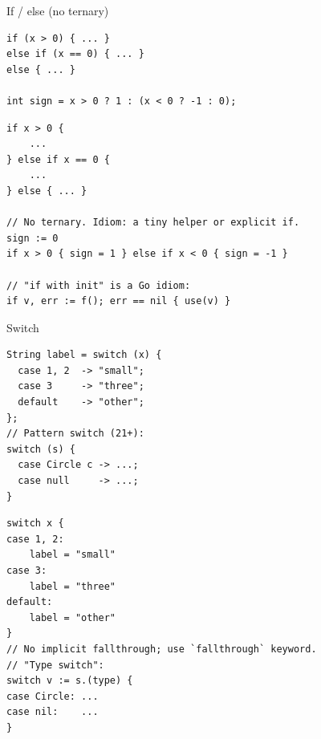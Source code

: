 \documentclass[10pt]{article}
\begin{document}
\begin{construct}{If / else (no ternary)}
\noindent
\begin{minipage}[t]{0.485\linewidth}
\begin{lstlisting}[style=java, title=Java]
if (x > 0) { ... }
else if (x == 0) { ... }
else { ... }

int sign = x > 0 ? 1 : (x < 0 ? -1 : 0);
\end{lstlisting}
\end{minipage}\hfill
\begin{minipage}[t]{0.485\linewidth}
\begin{lstlisting}[style=go, title=Go]
if x > 0 {
    ...
} else if x == 0 {
    ...
} else { ... }

// No ternary. Idiom: a tiny helper or explicit if.
sign := 0
if x > 0 { sign = 1 } else if x < 0 { sign = -1 }

// "if with init" is a Go idiom:
if v, err := f(); err == nil { use(v) }
\end{lstlisting}
\end{minipage}
\end{construct}

\begin{construct}{Switch}
\noindent
\begin{minipage}[t]{0.485\linewidth}
\begin{lstlisting}[style=java, title=Java]
String label = switch (x) {
  case 1, 2  -> "small";
  case 3     -> "three";
  default    -> "other";
};
// Pattern switch (21+):
switch (s) {
  case Circle c -> ...;
  case null     -> ...;
}
\end{lstlisting}
\end{minipage}\hfill
\begin{minipage}[t]{0.485\linewidth}
\begin{lstlisting}[style=go, title=Go]
switch x {
case 1, 2:
    label = "small"
case 3:
    label = "three"
default:
    label = "other"
}
// No implicit fallthrough; use `fallthrough` keyword.
// "Type switch":
switch v := s.(type) {
case Circle: ...
case nil:    ...
}
\end{lstlisting}
\end{minipage}
\end{construct}

\end{document}
